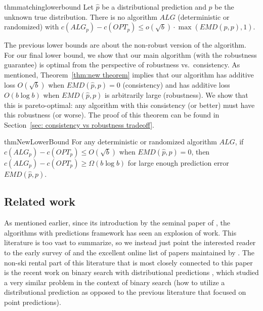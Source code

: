 \begin{restatable}{thm}{matchinglowerbound}
    \label{thm:lower bound for the multiplicative sqrt{b}EMD}
    Let $\hat{p}$ be a distributional prediction and $p$ be the unknown true distribution. There is no algorithm $ALG$ (deterministic or randomized) with $c(ALG_p) - c(OPT_p) \leq o\left(\sqrt{b}\right) \cdot \max(EMD(\hat{p},p),1)$.
\end{restatable}


The previous lower bounds are about the non-robust version of the algorithm.  For our final lower bound, we show that our main algorithm (with the robustness guarantee) is optimal from the perspective of robustness vs.\ consistency.  As mentioned, Theorem~\ref{thm:new theorem} implies that our algorithm has additive loss $O(\sqrt{b})$ when $EMD(\hat{p},p) = 0$ (consistency) and has additive loss $O(b \log b)$ when $EMD(\hat{p},p)$ is arbitrarily large (robustness).  We show that this is pareto-optimal: any algorithm with this consistency (or better) must have this robustness (or worse).  The proof of this theorem can be found in Section~\ref{sec: consistency vs robustness tradeoff}.


\begin{restatable}{thm}{NewLowerBound} \label{thm:new lower bound}
    For any deterministic or randomized algorithm $ALG$, if $c(ALG_p)-c(OPT_p)\le O\!\left(\sqrt b\right)$
    when $EMD(\hat p,p)=0$, then $c(ALG_p)-c(OPT_p)\ge \Omega(b\log b)$ for large enough prediction error $EMD(\hat p,p)$.
\end{restatable}



\subsection{Related work}
\label{subsec:related work}

As mentioned earlier, since its introduction by the seminal paper of \citet{LykourisANDVassilvitskii}, the algorithms with predictions framework has seen an explosion of work.  This literature is too vast to summarize, so we instead just point the interested reader to the early survey of \citet{MV02} and the excellent online list of papers maintained by \cite{ALPSweb}.  The non-ski rental part of this literature that is most closely connected to this paper is the recent work on binary search with distributional predictions \citep{dinitz2024binarysearchdistributionalpredictions}, which studied a very similar problem in the context of binary search (how to utilize a distributional prediction as opposed to the previous literature that focused on point predictions).

